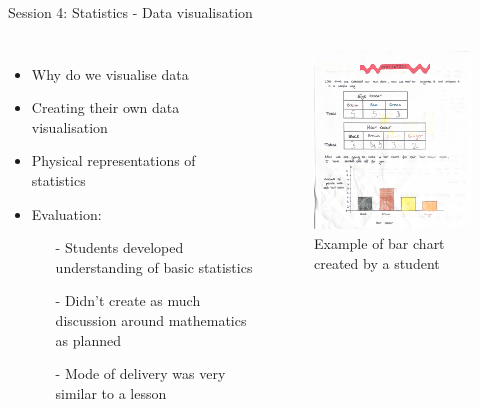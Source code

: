 \documentclass{beamer}  %
\begin{document}
\begin{frame}{Session 4: Statistics - Data visualisation}
    \begin{columns}
            \begin{itemize}
                \item Why do we visualise data
                \item Creating their own data visualisation
                \item Physical representations of statistics
                \item Evaluation:
                \begin{itemize}
                    \item[-] Students developed understanding of basic statistics
                    \item[-] Didn't create as much discussion around mathematics as planned
                    \item[-] Mode of delivery was very similar to a lesson 
                \end{itemize}
            \end{itemize}
        \begin{figure}
            \includegraphics[scale = 0.4]{Images/Presenting_data.png}
            \caption{Example of bar chart created by a student}
        \end{figure}
    \end{columns}

\end{frame}
\end{document}
